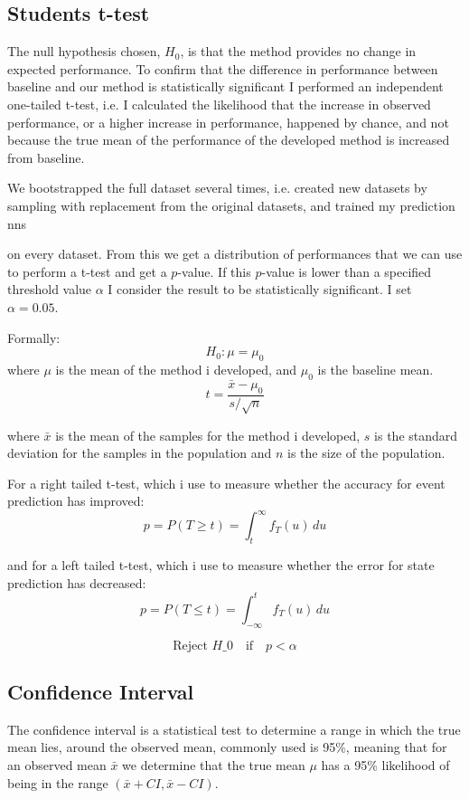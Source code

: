 \documentclass[UKenglish]{uiomasterthesis}
\begin{document}
\subsection{Students t-test}
The null hypothesis chosen, $H_0$, is that the method provides no change in expected performance. To confirm that the difference in performance between baseline and our method is statistically significant I performed an independent one-tailed t-test, i.e. I calculated the likelihood that the increase in observed performance, or a higher increase in performance, happened by chance, and not because the true mean of the performance of the developed method is increased from baseline.

We bootstrapped the full dataset several times, i.e. created new datasets by sampling with replacement from the original datasets, and trained my prediction \acp{nn} 

on every dataset. From this we get a distribution of performances that we can use to perform a t-test and get a $p$-value. If this $p$-value is lower than a specified threshold value $\alpha$ I consider the result to be statistically significant. I set $\alpha = 0.05$.

Formally: 
$$
H_0: \mu = \mu_0
$$
where $\mu$ is the mean of the method i developed, and $\mu_0$ is the baseline mean.
$$
t = \frac{\bar{x} - \mu_0}{s/\sqrt{n}}
$$

where $\bar{x}$ is the mean of the samples for the method i developed, $s$ is the standard deviation for the samples in the population and $n$ is the size of the population.

For a right tailed t-test, which i use to measure whether the accuracy for event prediction has improved:
$$p = P(T \geq t) = \int_{t}^{\infty} f_T(u)\,du$$

and for a left tailed t-test, which i use to measure whether the error for state prediction has decreased:
$$p = P(T \leq t) = \int_{-\infty}^{t} f_T(u)\,du$$

$$\text{Reject } H\_0 \quad \text{if} \quad p < \alpha$$

\subsection{Confidence Interval}
The confidence interval is a statistical test to determine a range in which the true mean lies, around the observed mean, commonly used is 95\%, meaning that for an observed mean $\bar{x}$ we determine that the true mean $\mu$ has a 95\% likelihood of being in the range $(\bar{x}+ CI, \bar{x} - CI)$\cite{ci}.
\end{document}
